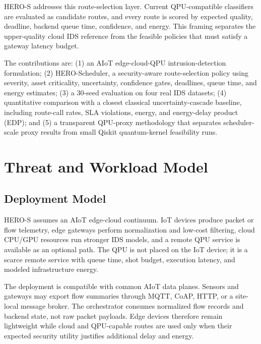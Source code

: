 \documentclass[conference]{IEEEtran}
\begin{document}
HERO-S addresses this route-selection layer. Current QPU-compatible classifiers are evaluated as candidate routes, and every route is scored by expected quality, deadline, backend queue time, confidence, and energy. This framing separates the upper-quality cloud IDS reference from the feasible policies that must satisfy a gateway latency budget.

The contributions are: (1) an AIoT edge-cloud-QPU intrusion-detection formulation; (2) HERO-Scheduler, a security-aware route-selection policy using severity, asset criticality, uncertainty, confidence gates, deadlines, queue time, and energy estimates; (3) a 30-seed evaluation on four real IDS datasets; (4) quantitative comparison with a closest classical uncertainty-cascade baseline, including route-call rates, SLA violations, energy, and energy-delay product (EDP); and (5) a transparent QPU-proxy methodology that separates scheduler-scale proxy results from small Qiskit quantum-kernel feasibility runs.

\section{Threat and Workload Model}
\subsection{Deployment Model}
HERO-S assumes an AIoT edge-cloud continuum. IoT devices produce packet or flow telemetry, edge gateways perform normalization and low-cost filtering, cloud CPU/GPU resources run stronger IDS models, and a remote QPU service is available as an optional path. The QPU is not placed on the IoT device; it is a scarce remote service with queue time, shot budget, execution latency, and modeled infrastructure energy.

The deployment is compatible with common AIoT data planes. Sensors and gateways may export flow summaries through MQTT, CoAP, HTTP, or a site-local message broker. The orchestrator consumes normalized flow records and backend state, not raw packet payloads. Edge devices therefore remain lightweight while cloud and QPU-capable routes are used only when their expected security utility justifies additional delay and energy.
\end{document}
